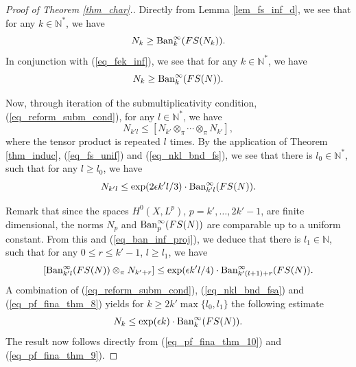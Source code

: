 \documentclass[12pt]{article}
\numberwithin{equation}{section}
\theoremstyle{theorem}
\theoremstyle{definition}
\theoremstyle{remark}
\newcommand{\nat}{\mathbb{N}}
\begin{document}
\begin{proof}[Proof of Theorem \ref{thm_char}.]
		\par 
		Directly from Lemma \ref{lem_fs_inf_d}, we see that for any $k \in \nat^*$, we have
		\begin{equation}\label{eq_norm_with_fs_compar}
			N_k \geq {\rm{Ban}}^{\infty}_{k}(FS(N_k)).
		\end{equation}		 
		In conjunction with (\ref{eq_fek_inf}), we see that for any $k \in \nat^*$, we have
		\begin{equation}\label{eq_pf_fina_thm_10}
			N_k \geq  {\rm{Ban}}^{\infty}_{k}(FS(N)).
		\end{equation}
		\par 
		Now, through iteration of the submultiplicativity condition, (\ref{eq_reform_subm_cond}), for any $l \in \nat^*$, we have
		\begin{equation}\label{eq_nkl_bnd_fs}
			N_{k' l} \leq [N_{k'} \otimes_{\pi} \cdots \otimes_{\pi} N_{k'}],
		\end{equation}
		where the tensor product is repeated $l$ times.
		By the application of Theorem \ref{thm_induc}, (\ref{eq_fs_unif}) and (\ref{eq_nkl_bnd_fs}), we see that there is $l_0 \in \nat^*$, such that for any $l \geq l_0$, we have
		\begin{equation}\label{eq_nkl_bnd_fsa}
			N_{k' l} \leq \exp(2 \epsilon k'l / 3) \cdot {\rm{Ban}}^{\infty}_{k'l}(FS(N)).
		\end{equation}
		\par 
		Remark that since the spaces $H^0(X, L^p)$, $p = k', \ldots, 2k' - 1$, are finite dimensional, the norms $N_p$ and ${\rm{Ban}}^{\infty}_{p}(FS(N))$ are comparable up to a uniform constant. 
		From this and (\ref{eq_ban_inf_proj}), we deduce that there is $l_1 \in \nat$, such that for any $0 \leq r \leq k' - 1$, $l \geq l_1$, we have
		\begin{equation}\label{eq_pf_fina_thm_8}
			[{\rm{Ban}}^{\infty}_{k' l}(FS(N)) \otimes_{\pi} N_{k' + r}] \leq \exp(\epsilon k'l / 4) \cdot {\rm{Ban}}^{\infty}_{k'(l + 1) + r}(FS(N)).
		\end{equation}		 
		A combination of (\ref{eq_reform_subm_cond}), (\ref{eq_nkl_bnd_fsa}) and (\ref{eq_pf_fina_thm_8}) yields for $k \geq 2 k' \max \{ l_0, l_1\}$ the following estimate
		\begin{equation}\label{eq_pf_fina_thm_9}
			N_{k} \leq \exp(\epsilon k) \cdot {\rm{Ban}}^{\infty}_{k}(FS(N)).
		\end{equation}
		The result now follows directly from (\ref{eq_pf_fina_thm_10}) and (\ref{eq_pf_fina_thm_9}).
	\end{proof}
\end{document}
